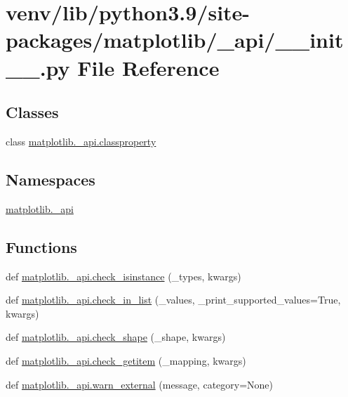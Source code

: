 \hypertarget{venv_2lib_2python3_89_2site-packages_2matplotlib_2__api_2____init_____8py}{}\section{venv/lib/python3.9/site-\/packages/matplotlib/\+\_\+api/\+\_\+\+\_\+init\+\_\+\+\_\+.py File Reference}
\label{venv_2lib_2python3_89_2site-packages_2matplotlib_2__api_2____init_____8py}
\subsection*{Classes}
\begin{DoxyCompactItemize}
\item 
class \hyperlink{classmatplotlib_1_1__api_1_1classproperty}{matplotlib.\+\_\+api.\+classproperty}
\end{DoxyCompactItemize}
\subsection*{Namespaces}
\begin{DoxyCompactItemize}
\item 
 \hyperlink{namespacematplotlib_1_1__api}{matplotlib.\+\_\+api}
\end{DoxyCompactItemize}
\subsection*{Functions}
\begin{DoxyCompactItemize}
\item 
def \hyperlink{namespacematplotlib_1_1__api_a56e2f2b8c5d54d2312723b8393149355}{matplotlib.\+\_\+api.\+check\+\_\+isinstance} (\+\_\+types, kwargs)
\item 
def \hyperlink{namespacematplotlib_1_1__api_a2164c58d6f07e67f7d7d486d53b24c47}{matplotlib.\+\_\+api.\+check\+\_\+in\+\_\+list} (\+\_\+values, \+\_\+print\+\_\+supported\+\_\+values=True, kwargs)
\item 
def \hyperlink{namespacematplotlib_1_1__api_aee2ab7522a67107f11c14ad87cdf19fc}{matplotlib.\+\_\+api.\+check\+\_\+shape} (\+\_\+shape, kwargs)
\item 
def \hyperlink{namespacematplotlib_1_1__api_af99f136fe109fdbc3c686232d820e987}{matplotlib.\+\_\+api.\+check\+\_\+getitem} (\+\_\+mapping, kwargs)
\item 
def \hyperlink{namespacematplotlib_1_1__api_ac668a8e9e8326aa746760038c8e264fa}{matplotlib.\+\_\+api.\+warn\+\_\+external} (message, category=None)
\end{DoxyCompactItemize}

